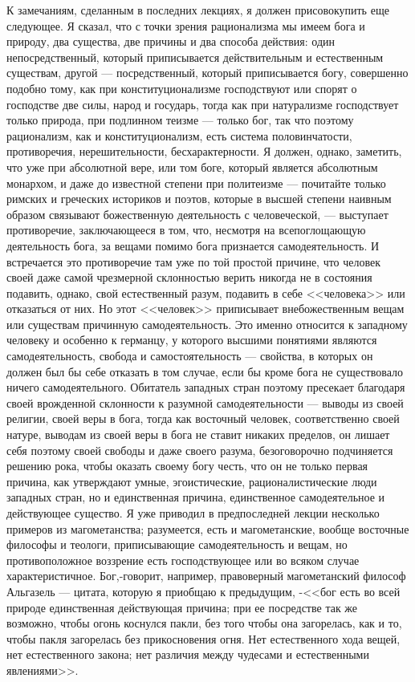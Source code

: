 \documentclass[12pt]{article}
\begin{document}
К замечаниям, сделанным в последних лекциях, я должен присовокупить еще следующее. Я сказал, что с точки зрения рационализма мы имеем бога и природу, два существа, две причины и два способа действия: один непосредственный, который приписывается действительным и естественным существам, другой --- посредственный, который приписывается богу, совершенно подобно тому, как при конституционализме господствуют или спорят о господстве две силы, народ и государь, тогда как при натурализме господствует только природа, при подлинном теизме --- только бог, так что поэтому рационализм, как и конституционализм, есть система половинчатости, противоречия, нерешительности, бесхарактерности. Я должен, однако, заметить, что уже при абсолютной вере, или том боге, который является абсолютным монархом, и даже до известной степени при политеизме --- почитайте только римских и греческих историков и поэтов, которые в высшей степени наивным образом связывают божественную деятельность с человеческой, --- выступает противоречие, заключающееся в том, что, несмотря на всепоглощающую деятельность бога, за вещами помимо бога признается самодеятельность. И встречается это противоречие там уже по той простой причине, что человек своей даже самой чрезмерной склонностью верить никогда не в состояния подавить, однако, свой естественный разум, подавить в себе <<человека>> или отказаться от них. Но этот <<человек>> приписывает внебожественным вещам или существам причинную самодеятельность. Это именно относится к западному человеку и особенно к германцу, у которого высшими понятиями являются самодеятельность, свобода и самостоятельность --- свойства, в которых он должен был бы себе отказать в том случае, если бы кроме бога не существовало ничего самодеятельного. Обитатель западных стран поэтому пресекает благодаря своей врожденной склонности к разумной самодеятельности --- выводы из своей религии, своей веры в бога, тогда как восточный человек, соответственно своей натуре, выводам из своей веры в бога не ставит никаких пределов, он лишает себя поэтому своей свободы и даже своего разума, безоговорочно подчиняется решению рока, чтобы оказать своему богу честь, что он не только первая причина, как утверждают умные, эгоистические, рационалистические люди западных стран, но и единственная причина, единственное самодеятельное и действующее существо. Я уже приводил в предпоследней лекции несколько примеров из магометанства; разумеется, есть и магометанские, вообще восточные философы и теологи, приписывающие самодеятельность и вещам, но противоположное воззрение есть господствующее или во всяком случае характеристичное. Бог,-говорит, например, правоверный магометанский философ Альгазель --- цитата, которую я приобщаю к предыдущим, -<<бог есть во всей природе единственная действующая причина; при ее посредстве так же возможно, чтобы огонь коснулся пакли, без того чтобы она загорелась, как и то, чтобы пакля загорелась без прикосновения огня. Нет естественного хода вещей, нет естественного закона; нет различия между чудесами и естественными явлениями>>. 
\end{document}
